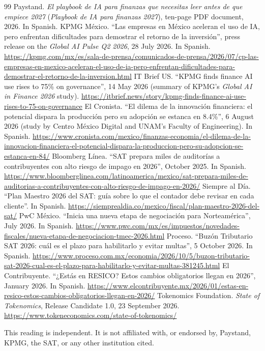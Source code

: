 \documentclass[11pt,a4paper]{article}
\begin{document}
\begin{thebibliography}{99}\small
{} Paystand. \emph{El playbook de IA para finanzas que necesitas leer antes de que empiece 2027} (\emph{Playbook de IA para finanzas 2027}), ten-page PDF document, 2026. In Spanish.
 KPMG M\'exico. ``Las empresas en M\'exico aceleran el uso de IA, pero enfrentan dificultades para demostrar el retorno de la inversi\'on'', press release on the \emph{Global AI Pulse Q2 2026}, 28 July 2026. In Spanish. \url{https://kpmg.com/mx/es/sala-de-prensa/comunicados-de-prensa/2026/07/cp-las-empresas-en-mexico-aceleran-el-uso-de-ia-pero-enfrentan-dificultades-para-demostrar-el-retorno-de-la-inversion.html}
 IT Brief US. ``KPMG finds finance AI use rises to 75\% on governance'', 14 May 2026 (summary of KPMG's \emph{Global AI in Finance 2026} study). \url{https://itbrief.news/story/kpmg-finds-finance-ai-use-rises-to-75-on-governance}
 El Cronista. ``El dilema de la innovaci\'on financiera: el potencial dispara la producci\'on pero su adopci\'on se estanca en 8.4\%'', 6 August 2026 (study by Centro M\'exico Digital and UNAM's Faculty of Engineering). In Spanish. \url{https://www.cronista.com/mexico/finanzas-economia/el-dilema-de-la-innovacion-financiera-el-potencial-dispara-la-produccion-pero-su-adopcion-se-estanca-en-84/}
 Bloomberg L\'inea. ``SAT prepara miles de auditor\'ias a contribuyentes con alto riesgo de impago en 2026'', October 2025. In Spanish. \url{https://www.bloomberglinea.com/latinoamerica/mexico/sat-prepara-miles-de-auditorias-a-contribuyentes-con-alto-riesgo-de-impago-en-2026/}
 Siempre al D\'ia. ``Plan Maestro 2026 del SAT: gu\'ia sobre lo que el contador debe revisar en cada cliente''. In Spanish. \url{https://siemprealdia.co/mexico/fiscal/plan-maestro-2026-del-sat/}
 PwC M\'exico. ``Inicia una nueva etapa de negociaci\'on para Norteam\'erica'', July 2026. In Spanish. \url{https://www.pwc.com/mx/es/impuestos/novedades-fiscales/nueva-etapa-de-negociacion-tmec-2026.html}
 Proceso. ``Buz\'on Tributario SAT 2026: cu\'al es el plazo para habilitarlo y evitar multas'', 5 October 2026. In Spanish. \url{https://www.proceso.com.mx/economia/2026/10/5/buzon-tributario-sat-2026-cual-es-el-plazo-para-habilitarlo-y-evitar-multas-381245.html}
 El Contribuyente. ``¿Estás en RESICO? Estos cambios obligatorios llegan en 2026'', January 2026. In Spanish. \url{https://www.elcontribuyente.mx/2026/01/estas-en-resico-estos-cambios-obligatorios-llegan-en-2026/}
 Tokenomics Foundation. \emph{State of Tokenomics}, Release Candidate 1.0, 23 September 2026. \url{https://www.tokeneconomics.com/state-of-tokenomics/}
\end{thebibliography}

\vfill
\begin{center}
\footnotesize\color{muted}
This reading is independent. It is not affiliated with, or endorsed by, Paystand, KPMG, the SAT, or any other institution cited.
\end{center}
\end{document}
